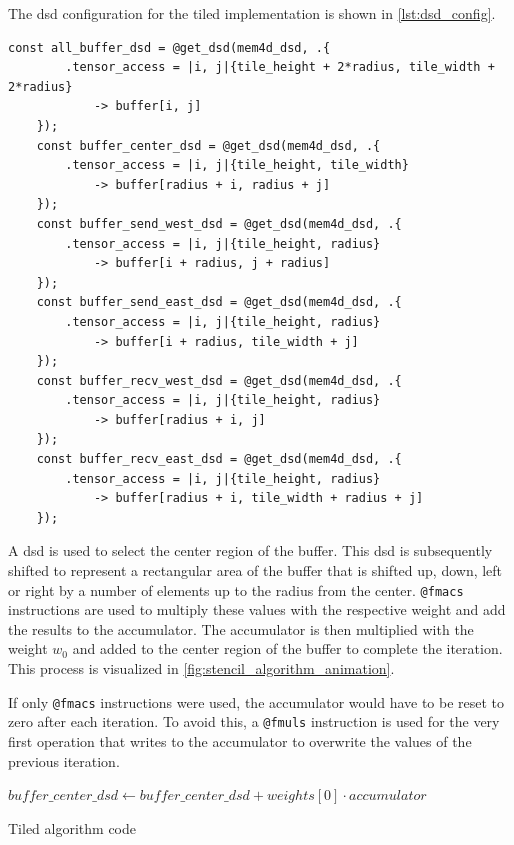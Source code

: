 The \ac{dsd} configuration for the tiled implementation is shown in \autoref{lst:dsd_config}.

\begin{lstlisting}[language=CSL, caption={DSD Configuration for Tiled Implementation}, label={lst:dsd_config}]
    const all_buffer_dsd = @get_dsd(mem4d_dsd, .{ 
        .tensor_access = |i, j|{tile_height + 2*radius, tile_width + 2*radius} 
            -> buffer[i, j] 
    });
    const buffer_center_dsd = @get_dsd(mem4d_dsd, .{ 
        .tensor_access = |i, j|{tile_height, tile_width} 
            -> buffer[radius + i, radius + j] 
    });
    const buffer_send_west_dsd = @get_dsd(mem4d_dsd, .{ 
        .tensor_access = |i, j|{tile_height, radius} 
            -> buffer[i + radius, j + radius] 
    });
    const buffer_send_east_dsd = @get_dsd(mem4d_dsd, .{ 
        .tensor_access = |i, j|{tile_height, radius} 
            -> buffer[i + radius, tile_width + j] 
    });
    const buffer_recv_west_dsd = @get_dsd(mem4d_dsd, .{ 
        .tensor_access = |i, j|{tile_height, radius} 
            -> buffer[radius + i, j] 
    });
    const buffer_recv_east_dsd = @get_dsd(mem4d_dsd, .{ 
        .tensor_access = |i, j|{tile_height, radius} 
            -> buffer[radius + i, tile_width + radius + j] 
    });    
\end{lstlisting}


A \ac{dsd} is used to select the center region of the buffer. This \ac{dsd} is subsequently shifted to represent a rectangular area of the buffer that is shifted up, down, left or right by a number of elements up to the radius from the center. \texttt{@fmacs} instructions are used to multiply these values with the respective weight and add the results to the accumulator. The accumulator is then multiplied with the weight $w_0$ and added to the center region of the buffer to complete the iteration. This process is visualized in \autoref{fig:stencil_algorithm_animation}.

If only \texttt{@fmacs} instructions were used, the accumulator would have to be reset to zero after each iteration. To avoid this, a \texttt{@fmuls} instruction is used for the very first operation that writes to the accumulator to overwrite the values of the previous iteration.

\begin{algorithm}[tbh]
    \SetAlgoLined
    $buffer\_center\_dsd \gets buffer\_center\_dsd + weights[0] \cdot accumulator$\;
    \caption{Tiled algorithm code}\label{alg:tiled_algorithm}
\end{algorithm}

